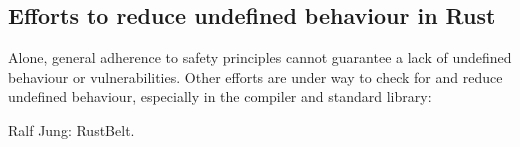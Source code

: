 \documentclass[dissertation.tex]{subfiles}
\begin{document}
\subsection{Efforts to reduce undefined behaviour in Rust}
Alone, general adherence to safety principles cannot guarantee a lack of
undefined behaviour or vulnerabilities.
Other efforts are under way to check for and reduce undefined behaviour,
especially in the compiler and standard library:

Ralf Jung: RustBelt.
\end{document}
